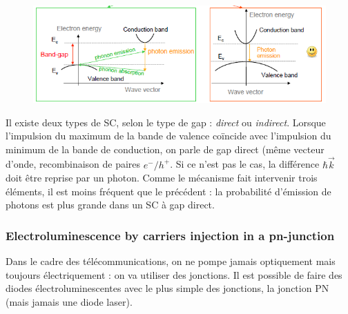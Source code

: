 	\begin{figure}
	\vspace{-5mm}
	\includegraphics[scale=0.6]{ch4/image3}
	\end{figure}
Il existe deux types de SC, selon le type de gap : \textit{direct} ou \textit{indirect}. Lorsque 
l'impulsion du maximum de la bande de valence coïncide avec l'impulsion du minimum de la bande 
de conduction, on parle de gap direct (même vecteur d'onde, recombinaison de paires $e^-/h^+$. Si
ce n'est pas le cas, la différence $\hbar\vec{k}$ doit être reprise par un photon. Comme le mécanisme
fait intervenir trois éléments, il est moins fréquent que le précédent : la probabilité d'émission 
de photons est plus grande dans un SC à gap direct.

\subsubsection{Electroluminescence by carriers injection in a pn-junction}
Dans le cadre des télécommunications, on ne pompe jamais optiquement mais toujours 
électriquement : on va utiliser des jonctions. Il est possible de faire des diodes électroluminescentes avec le plus simple des jonctions, la jonction PN (mais jamais une diode laser). \\

